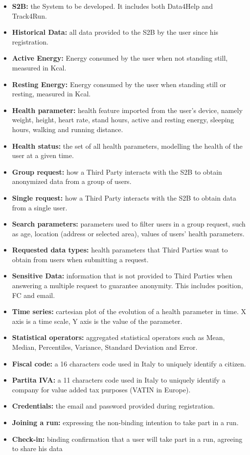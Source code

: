 \documentclass[titlepage]{article}
\begin{document}
			\begin{itemize}
				\item {\bf S2B: } the System to be developed. It includes both Data4Help and Track4Run.
				 \item {\bf Historical Data:} all data provided to the S2B by the user since his registration.
				\item{\bf Active Energy:} Energy consumed by the user when not standing still, measured in Kcal.
				\item{\bf Resting Energy:} Energy consumed by the user when standing still or resting, measured in Kcal.
				\item{\bf Health parameter: } health feature imported from the user’s device, namely weight, height, heart rate, stand hours, active and resting energy, sleeping hours, walking and running distance.
				\item{\bf Health status: } the set of all health parameters, modelling the health of the user at a given time.
				\item{\bf  Group request:} how a Third Party interacts with the S2B to obtain anonymized data from a group of users.
				\item{\bf Single request: } how a Third Party interacts with the S2B to obtain data from a single user.
				\item{\bf Search parameters:} parameters used to filter users in a group request, such as age, location (address or selected area), values of users’ health parameters.
				\item{\bf Requested data types: } health parameters that Third Parties want to obtain from users when submitting a request.
				\item{\bf Sensitive Data:  } information that is not provided to Third Parties when answering a multiple request to guarantee anonymity. This includes position, FC and email.				
				\item{\bf Time series: } cartesian plot of the evolution of a health parameter in time. X axis is a time scale, Y axis is the value of the parameter.
				\item{\bf Statistical operators:} aggregated statistical operators such as Mean, Median, Percentiles, Variance, Standard Deviation and Error.		
				\item{\bf Fiscal code: } a 16 characters code used in Italy to uniquely identify a citizen.
				\item{\bf Partita IVA: } a 11 characters code used in Italy to uniquely identify a company for value added tax purposes (VATIN in Europe).
				\item{\bf Credentials: } the email and password provided during registration.
				\item{\bf Joining a run: } expressing the non-binding intention to take part in a run.
				\item{\bf Check-in: } binding confirmation that a user will take part in a run, agreeing to share his data			\end{itemize}
				
\end{document}

